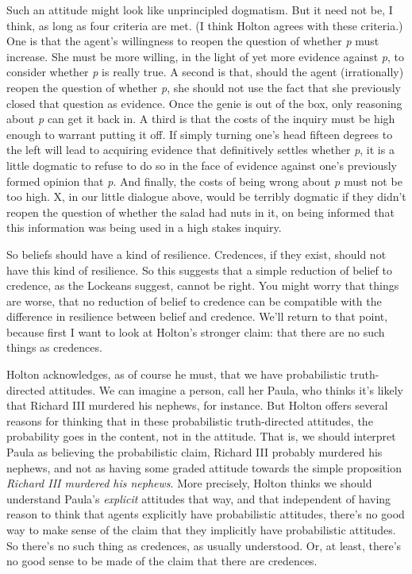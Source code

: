 \documentclass[
  10pt,
  letterpaper,
  DIV=11,
  numbers=noendperiod,
  twoside]{scrartcl}
\begin{document}
Such an attitude might look like unprincipled dogmatism. But it need not
be, I think, as long as four criteria are met. (I think Holton agrees
with these criteria.) One is that the agent's willingness to reopen the
question of whether \emph{p} must increase. She must be more willing, in
the light of yet more evidence against \emph{p}, to consider whether
\emph{p} is really true. A second is that, should the agent
(irrationally) reopen the question of whether \emph{p}, she should not
use the fact that she previously closed that question as evidence. Once
the genie is out of the box, only reasoning about \emph{p} can get it
back in. A third is that the costs of the inquiry must be high enough to
warrant putting it off. If simply turning one's head fifteen degrees to
the left will lead to acquiring evidence that definitively settles
whether \emph{p}, it is a little dogmatic to refuse to do so in the face
of evidence against one's previously formed opinion that \emph{p}. And
finally, the costs of being wrong about \emph{p} must not be too high.
X, in our little dialogue above, would be terribly dogmatic if they
didn't reopen the question of whether the salad had nuts in it, on being
informed that this information was being used in a high stakes inquiry.

So beliefs should have a kind of resilience. Credences, if they exist,
should not have this kind of resilience. So this suggests that a simple
reduction of belief to credence, as the Lockeans suggest, cannot be
right. You might worry that things are worse, that no reduction of
belief to credence can be compatible with the difference in resilience
between belief and credence. We'll return to that point, because first I
want to look at Holton's stronger claim: that there are no such things
as credences.

Holton acknowledges, as of course he must, that we have probabilistic
truth-directed attitudes. We can imagine a person, call her Paula, who
thinks it's likely that Richard III murdered his nephews, for instance.
But Holton offers several reasons for thinking that in these
probabilistic truth-directed attitudes, the probability goes in the
content, not in the attitude. That is, we should interpret Paula as
believing the probabilistic claim, Richard III probably murdered his
nephews, and not as having some graded attitude towards the simple
proposition \emph{Richard III murdered his nephews}. More precisely,
Holton thinks we should understand Paula's \emph{explicit} attitudes
that way, and that independent of having reason to think that agents
explicitly have probabilistic attitudes, there's no good way to make
sense of the claim that they implicitly have probabilistic attitudes. So
there's no such thing as credences, as usually understood. Or, at least,
there's no good sense to be made of the claim that there are credences.
\end{document}
